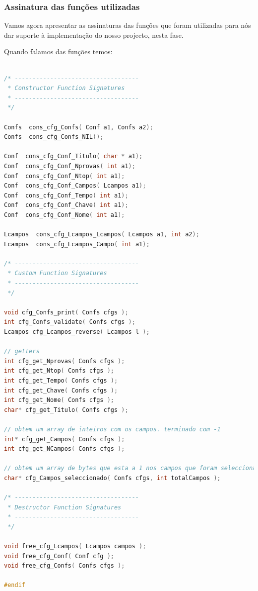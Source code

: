 \documentclass[11pt, a4paper, oneside]{article}
\begin{document}
\subsubsection{Assinatura das funções utilizadas}
Vamos agora apresentar as assinaturas das funções que foram utilizadas para nós dar suporte à implementação do nosso projecto, nesta fase.

Quando falamos das funções temos: 
\begin{lstlisting}[language=C, caption={Construtores do ficheiro de resultados.}]

/* -----------------------------------
 * Constructor Function Signatures
 * -----------------------------------
 */

Confs  cons_cfg_Confs( Conf a1, Confs a2);
Confs  cons_cfg_Confs_NIL();

Conf  cons_cfg_Conf_Titulo( char * a1);
Conf  cons_cfg_Conf_Nprovas( int a1);
Conf  cons_cfg_Conf_Ntop( int a1);
Conf  cons_cfg_Conf_Campos( Lcampos a1);
Conf  cons_cfg_Conf_Tempo( int a1);
Conf  cons_cfg_Conf_Chave( int a1);
Conf  cons_cfg_Conf_Nome( int a1);

Lcampos  cons_cfg_Lcampos_Lcampos( Lcampos a1, int a2);
Lcampos  cons_cfg_Lcampos_Campo( int a1);

/* -----------------------------------
 * Custom Function Signatures
 * -----------------------------------
 */

void cfg_Confs_print( Confs cfgs );
int cfg_Confs_validate( Confs cfgs );
Lcampos cfg_Lcampos_reverse( Lcampos l );

// getters
int cfg_get_Nprovas( Confs cfgs );
int cfg_get_Ntop( Confs cfgs );
int cfg_get_Tempo( Confs cfgs );
int cfg_get_Chave( Confs cfgs );
int cfg_get_Nome( Confs cfgs );
char* cfg_get_Titulo( Confs cfgs );

// obtem um array de inteiros com os campos. terminado com -1
int* cfg_get_Campos( Confs cfgs );
int cfg_get_NCampos( Confs cfgs );

// obtem um array de bytes que esta a 1 nos campos que foram seleccionados
char* cfg_Campos_seleccionado( Confs cfgs, int totalCampos );

/* -----------------------------------
 * Destructor Function Signatures
 * -----------------------------------
 */

void free_cfg_Lcampos( Lcampos campos );
void free_cfg_Conf( Conf cfg );
void free_cfg_Confs( Confs cfgs );

#endif
\end{lstlisting} 
\newpage
\end{document}
